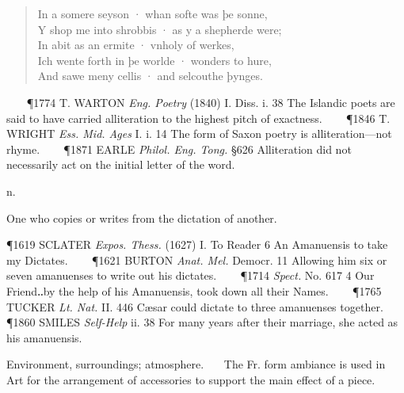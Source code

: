 \begin{description}[wide, labelwidth=!, labelindent=0pt]
\begin{myenumerate}
\begin{verse}
In a somere seyson · whan softe was þe sonne,  \\
Y shop me into shrobbis · as y a shepherde were;   \\
In abit as an ermite · vnholy of werkes,  \\
Ich wente forth in þe worlde · wonders to hure,   \\
And sawe meny cellis · and selcouthe þynges.
\end{verse}
   
\P 1774 T. WARTON \textit{Eng. Poetry} (1840) I. Diss. i. 38 The Islandic poets are said to have carried alliteration to the highest pitch of exactness.    
\P 1846 T. WRIGHT \textit{Ess. Mid. Ages} I. i. 14 The form of Saxon poetry is alliteration—not rhyme.    
\P 1871 EARLE \textit{Philol. Eng. Tong.} §626 Alliteration did not necessarily act on the initial letter of the word.
\end{myenumerate}

  n.

\noindent  {}


\noindent  
One who copies or writes from the dictation of another. 

\P 1619 SCLATER \textit{Expos. Thess.} (1627) I. To Reader 6 An Amanuensis to take my Dictates.    
\P 1621 BURTON \textit{Anat. Mel.} Democr. 11 Allowing him six or seven amanuenses to write out his dictates.    
\P 1714 \textit{Spect.} No. 617 4 Our Friend‥by the help of his Amanuensis, took down all their Names.    
\P 1765 TUCKER \textit{Lt. Nat.} II. 446 Cæsar could dictate to three amanuenses together.    
\P 1860 SMILES \textit{Self-Help} ii. 38 For many years after their marriage, she acted as his amanuensis.


\noindent  {}

\vspace{-0.3cm}

\begin{myenumerate}
 Environment, surroundings; atmosphere. 
   The Fr. form ambiance is used in Art for the arrangement of accessories to support the main effect of a piece. 


\end{myenumerate}
\end{description}
